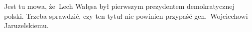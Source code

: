 \documentclass[a4paper,11pt]{article}
\numberwithin{equation}{section}
\begin{document}

\vspace{0em}



\vspace{0em}


\noindent
{} Jest tu mowa, że~Lech Wałęsa był pierwszym prezydentem
demokratycznej polski. Trzeba sprawdzić, czy ten tytuł nie powinien
przypaść gen.~Wojciechowi Jaruzelskiemu.







\VerSpaceFive
\end{document}
